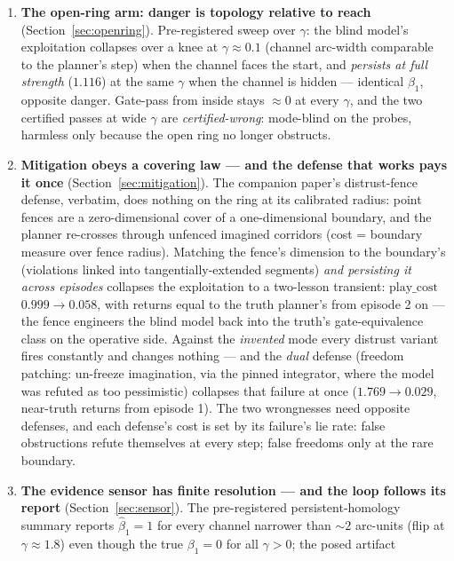 \documentclass[11pt]{article}
\theoremstyle{remark}
\begin{document}
\begin{enumerate}
  radius anchored in the reward specification --- and the strongest
  cross-family repairer (Claude, 3/3) used exactly the same form.
\item \textbf{The open-ring arm: danger is topology relative to reach}
  (Section~\ref{sec:openring}). Pre-registered sweep over $\gamma$: the
  blind model's exploitation collapses over a knee at $\gamma \approx 0.1$
  (channel arc-width comparable to the planner's step) when the channel
  faces the start, and \emph{persists at full strength} ($1.116$) at the
  same $\gamma$ when the channel is hidden --- identical $\beta_1$, opposite
  danger. Gate-pass from inside stays ${\approx}0$ at every $\gamma$, and
  the two certified passes at wide $\gamma$ are \emph{certified-wrong}:
  mode-blind on the probes, harmless only because the open ring no longer
  obstructs.
\item \textbf{Mitigation obeys a covering law --- and the defense that
  works pays it once} (Section~\ref{sec:mitigation}). The companion
  paper's distrust-fence defense, verbatim, does nothing on the ring at its
  calibrated radius: point fences are a zero-dimensional cover of a
  one-dimensional boundary, and the planner re-crosses through unfenced
  imagined corridors (cost = boundary measure over fence radius). Matching
  the fence's dimension to the boundary's (violations linked into
  tangentially-extended segments) \emph{and persisting it across episodes}
  collapses the exploitation to a two-lesson transient:
  $\mathrm{play\_cost}$ $0.999 \to 0.058$, with returns equal to the
  truth planner's from episode 2 on --- the fence engineers the blind model
  back into the truth's gate-equivalence class on the operative side.
  Against the \emph{invented} mode every distrust variant fires constantly
  and changes nothing --- and the \emph{dual} defense (freedom patching:
  un-freeze imagination, via the pinned integrator, where the model was
  refuted as too pessimistic) collapses that failure at once
  ($1.769 \to 0.029$, near-truth returns from episode 1). The two
  wrongnesses need opposite defenses, and each defense's cost is set by its
  failure's lie rate: false obstructions refute themselves at every step;
  false freedoms only at the rare boundary.
\item \textbf{The evidence sensor has finite resolution --- and the loop
  follows its report} (Section~\ref{sec:sensor}). The pre-registered
  persistent-homology summary reports $\hat\beta_1 = 1$ for every channel
  narrower than ${\sim}2$ arc-units (flip at $\gamma \approx 1.8$) even
  though the true $\beta_1 = 0$ for all $\gamma > 0$; the posed artifact

\end{enumerate}
\end{document}
